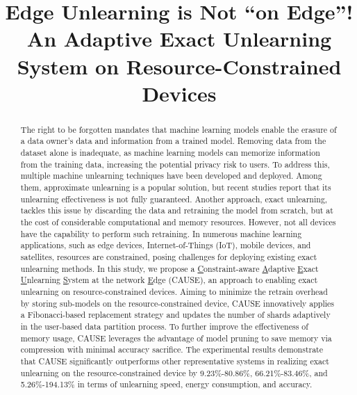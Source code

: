 \documentclass[conference,compsoc]{IEEEtran}
\begin{document}
\title{Edge Unlearning is Not ``on Edge''!\\ An Adaptive Exact Unlearning System on Resource-Constrained Devices}
\author{

}



\maketitle

\begin{abstract}
The right to be forgotten mandates that machine learning models enable the erasure of a data owner's data and information from a trained model.
Removing data from the dataset alone is inadequate, as machine learning models can memorize information from the training data, increasing the potential privacy risk to users. To address this, multiple machine unlearning techniques have been developed and deployed. Among them, approximate unlearning is a popular solution, but recent studies report that its unlearning effectiveness is not fully guaranteed. 
Another approach, exact unlearning, tackles this issue by discarding the data and retraining the model from scratch, but at the cost of considerable computational and memory resources. However, not all devices have the capability to perform such retraining. In numerous machine learning applications, such as edge devices, Internet-of-Things (IoT), mobile devices, and satellites, resources are constrained, posing challenges for deploying existing exact unlearning methods.
In this study, we propose a \underline{C}onstraint-aware \underline{A}daptive \underline{E}xact \underline{U}nlearning \underline{S}ystem at the network \underline{E}dge (CAUSE), an approach to enabling exact unlearning on resource-constrained devices. 
Aiming to minimize the retrain overhead by storing sub-models on the resource-constrained device, CAUSE innovatively applies a Fibonacci-based replacement strategy and updates the number of shards adaptively in the user-based data partition process. To further improve the effectiveness of memory usage, CAUSE leverages the advantage of model pruning to save memory via compression with minimal accuracy sacrifice. 
The experimental results demonstrate that CAUSE significantly outperforms other representative systems in realizing exact unlearning on the resource-constrained device by 9.23\%-80.86\%, 66.21\%-83.46\%, and 5.26\%-194.13\% in terms of unlearning speed, energy consumption, and accuracy. 
\end{abstract}
\end{document}

